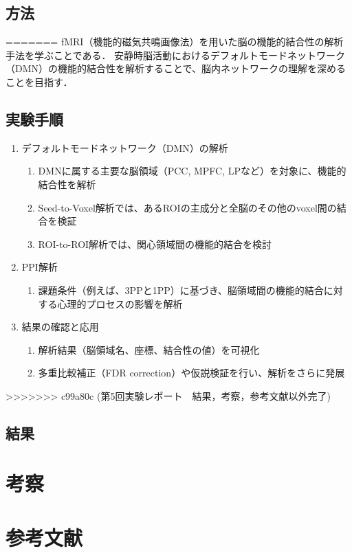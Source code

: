 \documentclass{jlreq}
\begin{document}
\subsection{方法}

=======
fMRI（機能的磁気共鳴画像法）を用いた脳の機能的結合性の解析手法を学ぶことである．
安静時脳活動におけるデフォルトモードネットワーク（DMN）の機能的結合性を解析することで、脳内ネットワークの理解を深めることを目指す．
\subsection{実験手順}
\begin{enumerate}
    \item デフォルトモードネットワーク（DMN）の解析
    \begin{enumerate}
        \item DMNに属する主要な脳領域（PCC, MPFC, LPなど）を対象に、機能的結合性を解析
        \item Seed-to-Voxel解析では、あるROIの主成分と全脳のその他のvoxel間の結合を検証
        \item ROI-to-ROI解析では、関心領域間の機能的結合を検討
    \end{enumerate}

    \item PPI解析 
    \begin{enumerate}
        \item 課題条件（例えば、3PPと1PP）に基づき、脳領域間の機能的結合に対する心理的プロセスの影響を解析
    \end{enumerate}

    \item 結果の確認と応用
    \begin{enumerate}
        \item 解析結果（脳領域名、座標、結合性の値）を可視化
        \item 多重比較補正（FDR correction）や仮説検証を行い、解析をさらに発展
    \end{enumerate}
\end{enumerate}
>>>>>>> c99a80c (第5回実験レポート　結果，考察，参考文献以外完了)
\subsection{結果}



\section{考察}



\section*{参考文献}
\end{document}
